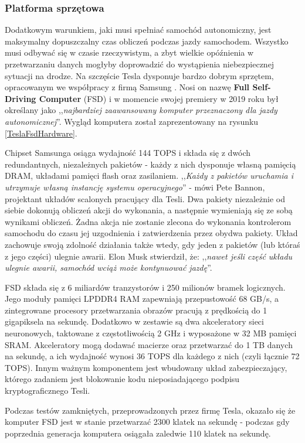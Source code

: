 \subsubsection{Platforma sprzętowa}
Dodatkowym warunkiem, jaki musi spełniać samochód autonomiczny, jest maksymalny dopuszczalny czas obliczeń podczas jazdy samochodem. Wszystko musi odbywać się w czasie rzeczywistym, a zbyt wielkie opóźnienia w przetwarzaniu danych mogłyby doprowadzić do wystąpienia niebezpiecznej sytuacji na drodze. Na szczęście Tesla dysponuje bardzo dobrym sprzętem, opracowanym we współpracy z firmą Samsung \cite{wiggers:teslaDrivingChip, teslaHardware:detailed}. Nosi on nazwę \textbf{Full Self-Driving Computer} (FSD) i w momencie swojej premiery w 2019 roku był określany jako ,,\textit{najbardziej zaawansowany komputer przeznaczony dla jazdy autonomicznej}''. Wygląd komputera został zaprezentowany na rysunku \ref{TeslaFsdHardware}.

Chipset Samsunga osiąga wydajność 144 TOPS i składa się z dwóch redundantnych, niezależnych pakietów - każdy z nich dysponuje własną pamięcią DRAM, układami pamięci flash oraz zasilaniem. ,,\textit{Każdy z pakietów uruchamia i utrzymuje własną instancję systemu operacyjnego}'' - mówi Pete Bannon, projektant układów scalonych pracujący dla Tesli. Dwa pakiety niezależnie od siebie dokonują obliczeń akcji do wykonania, a następnie wymieniają się ze sobą wynikami obliczeń. Żadna akcja nie zostanie zlecona do wykonania kontrolerom samochodu do czasu jej uzgodnienia i zatwierdzenia przez obydwa pakiety. Układ zachowuje swoją zdolność działania także wtedy, gdy jeden z pakietów (lub któraś z jego części) ulegnie awarii. Elon Musk stwierdził, że: ,,\textit{nawet jeśli część układu ulegnie awarii, samochód wciąż może kontynuować jazdę}''.

FSD składa się z 6 miliardów tranzystorów i 250 milionów bramek logicznych. Jego moduły pamięci LPDDR4 RAM zapewniają przepustowość 68 GB/s, a zintegrowane procesory przetwarzania obrazów pracują z prędkością do 1 gigapiksela na sekundę. Dodatkowo w zestawie są dwa akceleratory sieci neuronowych, taktowane z częstotliwością 2 GHz i wyposażone w 32 MB pamięci SRAM. Akceleratory mogą dodawać macierze oraz przetwarzać do 1 TB danych na sekundę, a ich wydajność wynosi 36 TOPS dla każdego z nich (czyli łącznie 72 TOPS). Innym ważnym komponentem jest wbudowany układ zabezpieczający, którego zadaniem jest blokowanie kodu nieposiadającego podpisu kryptograficznego Tesli.

Podczas testów zamkniętych, przeprowadzonych przez firmę Tesla, okazało się że komputer FSD jest w stanie przetwarzać 2300 klatek na sekundę - podczas gdy poprzednia generacja komputera osiągała zaledwie 110 klatek na sekundę. \\

